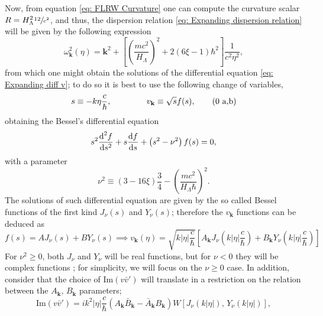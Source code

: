 Now, from equation \ref{eq: FLRW Curvature} one can compute the curvature scalar $R=H_\Lambda^2\sfrac{12}{c^2}$, and thus, the dispersion relation \ref{eq: Expanding dispersion relation} will be given by the following expression
\begin{equation}\label{eq: de Sitter dispersion relation}
	\omega^2_\mathbf{k}(\eta)=\mathbf{k}^2+\left[\left(\frac{mc^2}{H_\Lambda}\right)^2+2\left(6\xi-1\right)\hbar^2\right]\frac{1}{c^2\eta^2},
\end{equation}
from which one might obtain the solutions of the differential equation \ref{eq: Expanding diff v}; to do so it is best to use the following change of variables,
\begin{subequations}
	\begin{gather}
		s\equiv -k\eta\frac{c}{\hbar},\hspace{1.5cm}v_\mathbf{k}\equiv \sqrt{s}f(s),\tag{\theequation \,\,a,b}
	\end{gather}
\end{subequations}
obtaining the Bessel's differential equation
\begin{equation}
	s^2\frac{\text{d}^2f}{\text{d} s^2}+s\frac{\text{d} f}{\text{d} s}+\left(s^2-\nu^2\right)f(s)=0,
\end{equation}
with a parameter
\begin{equation}
	\nu^2\equiv \left(3-16\xi\right)\frac{3}{4}-\left(\frac{mc^2}{H_\Lambda\hbar }\right)^2.
\end{equation}
The solutions of such differential equation are given by the so called Bessel functions of the first kind $J_\nu(s)$ and $Y_\nu(s)$; therefore the $v_\mathbf{k}$ functions can be deduced as
\begin{equation}\label{eq: de Sitter general v}
	f(s)=AJ_\nu(s)+BY_\nu(s)\implies v_\mathbf{k}(\eta)=\sqrt{k|\eta|\frac{c}{\hbar}}\left[A_\mathbf{k}J_\nu(k|\eta|\frac{c}{\hbar})+B_\mathbf{k}Y_\nu(k|\eta|\frac{c}{\hbar})\right]
\end{equation}
For $\nu^2\geq 0$, both $J_\nu$ and $Y_\nu$ will be real functions, but for $\nu<0$ they will be complex functions \cite{BesselComplex}; for simplicity, we will focus on the $\nu\geq 0$ case. In addition, consider that the choice of $\text{Im}(v\bar v')$ will translate in a restriction on the relation between the  $A_\mathbf{k},\,B_\mathbf{k}$ parameters;
\begin{equation}
	\text{Im}\left(v\bar{v}'\right)=ik^2|\eta|\frac{c}{\hbar}\left(A_\mathbf{k}\bar{B}_\mathbf{k}-\bar{A}_\mathbf{k}B_\mathbf{k}\right)W\left[J_\nu\left(k|\eta|\right),\,Y_\nu\left(k|\eta|\right)\right],
\end{equation}
